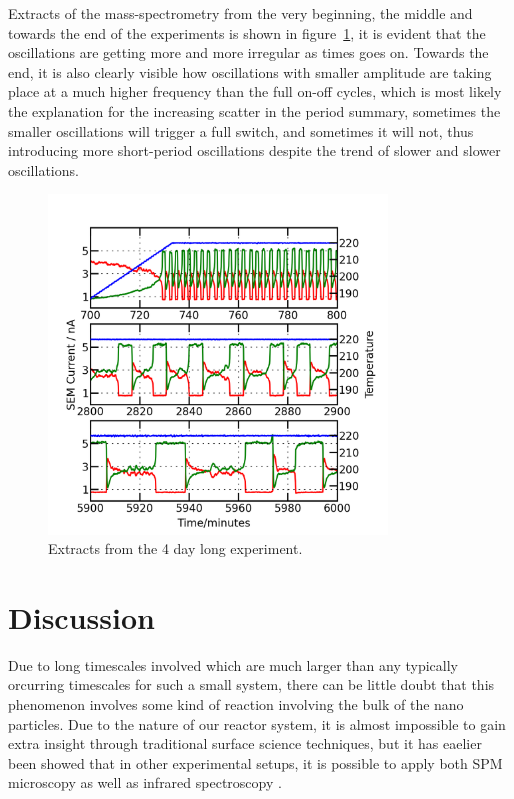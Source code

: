 \documentclass[8.5pt,twoside,twocolumn]{article}
\begin{document}
Extracts of the mass-spectrometry from the very beginning, the middle and towards the end of the experiments is shown in figure~\ref{fgr:extracts}, it is evident that the oscillations are getting more and more irregular as times goes on. Towards the end, it is also clearly visible how  oscillations with smaller amplitude are taking place at a much higher frequency than the full on-off cycles, which is most likely the explanation for the increasing scatter in the period summary, sometimes the smaller oscillations will trigger a full switch, and sometimes it will not, thus introducing more short-period oscillations despite the trend of slower and slower oscillations.
\begin{figure}[h]
  \centering
  \includegraphics[width=9cm]{extracts_from_very_long_oscillation.png}
  \caption{Extracts from the 4 day long experiment.}
  \label{fgr:extracts}
\end{figure}


\section{Discussion}
Due to long timescales involved which are much larger than any typically orcurring timescales for such a small system, there can be little doubt that this phenomenon involves some kind of reaction involving the bulk of the nano particles. Due to the nature of our reactor system, it is almost impossible to gain extra insight through traditional surface science techniques, but it has eaelier been showed that in other experimental setups, it is possible to apply both SPM microscopy \cite{Hendriksen2005} as well as infrared spectroscopy \cite{Carlsson2006}.
\end{document}
